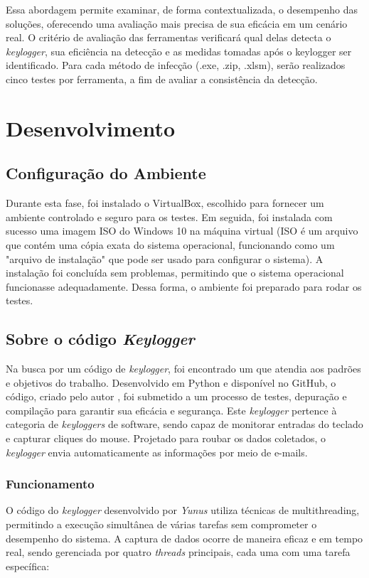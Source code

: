 \documentclass[12pt]{article}
\begin{document}
Essa abordagem permite examinar, 
de forma contextualizada, o desempenho das soluções, 
oferecendo uma avaliação mais precisa de sua eficácia em um cenário real. 
O critério de avaliação das ferramentas verificará qual delas detecta o \textit{keylogger}, 
sua eficiência na detecção e as medidas tomadas após o keylogger ser identificado. 
Para cada método de infecção (.exe, .zip, .xlsm), serão realizados cinco testes por ferramenta, 
a fim de avaliar a consistência da detecção.
\section{Desenvolvimento}

\subsection{Configuração do Ambiente}

Durante esta fase, foi instalado o VirtualBox, escolhido para fornecer 
um ambiente controlado e seguro para os testes. Em seguida, foi instalada 
com sucesso uma imagem ISO do Windows 10 na máquina virtual (ISO é um arquivo 
que contém uma cópia exata do sistema operacional, funcionando como um "arquivo 
de instalação" que pode ser usado para configurar o sistema). 
A instalação foi concluída sem problemas, permitindo que o sistema operacional 
funcionasse adequadamente. Dessa forma, o ambiente foi preparado para rodar os testes.
\subsection{Sobre o código \textit{Keylogger}}

Na busca por um código de \textit{keylogger}, foi encontrado um que atendia aos padrões e objetivos do trabalho. Desenvolvido em Python e disponível no GitHub, o código, criado pelo autor \citep{Aydinnyunus}, foi submetido a um processo de testes, depuração e compilação para garantir sua eficácia e segurança. Este \textit{keylogger} pertence à categoria de \textit{keyloggers} de software, sendo capaz de monitorar entradas do teclado e capturar cliques do mouse. Projetado para roubar os dados coletados, o \textit{keylogger} envia automaticamente as informações por meio de e-mails.

\subsubsection{Funcionamento}

O código do \textit{keylogger} desenvolvido por \textit{Yunus} utiliza técnicas de multithreading, permitindo a execução simultânea de várias tarefas sem comprometer o desempenho do sistema. A captura de dados ocorre de maneira eficaz e em tempo real, sendo gerenciada por quatro \textit{threads} principais, cada uma com uma tarefa específica:
\end{document}
